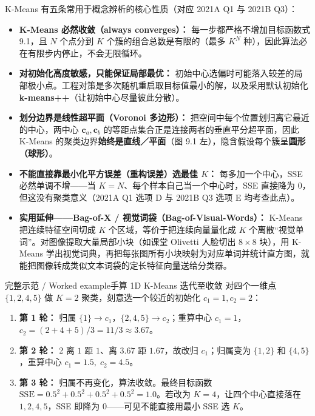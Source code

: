 K-Means 有五条常用于概念辨析的核心性质（对应 2021A Q1 与 2021B Q3）：
\begin{itemize}
\item \textbf{K-Means 必然收敛（always converges）：} 每一步都严格不增加目标函数式 9.1，且 $N$ 个点分到 $K$ 个簇的组合总数是有限的（最多 $K^N$ 种），因此算法必在有限步内停止，不会无限循环。
\item \textbf{对初始化高度敏感，只能保证局部最优：} 初始中心选偏时可能落入较差的局部极小点。工程对策是多次随机重启取目标值最小的解，以及采用默认初始化 \textbf{k-means++}（让初始中心尽量彼此分散）。
\item \textbf{划分边界是线性超平面（Voronoi 多边形）：} 把空间中每个位置划归离它最近的中心，两中心 $\mathbf{c}_a, \mathbf{c}_b$ 的等距点集合正是连接两者的垂直平分超平面，因此 K-Means 的聚类边界\textbf{始终是直线／平面}（图 9.1 左），隐含假设每个簇呈\textbf{圆形（球形）}。
\item \textbf{不能直接靠最小化平方误差（重构误差）选最佳 $K$：} 每多加一个中心，SSE 必然单调不增——当 $K=N$、每个样本自己当一个中心时，SSE 直接降为 0，但这没有聚类意义（2021A Q1 选项 D 与 2021B Q3 选项 E 均考查此点）。
\item \textbf{实用延伸——Bag-of-X / 视觉词袋（Bag-of-Visual-Words）：} K-Means 把连续特征空间切成 $K$ 个区域，等价于把连续向量量化成 $K$ 个离散“视觉单词”。对图像提取大量局部小块（如课堂 Olivetti 人脸切出 $8\times 8$ 块），用 K-Means 学出视觉词典，再把每张图所有小块映射为对应单词并统计直方图，就能把图像转成类似文本词袋的定长特征向量送给分类器。
\end{itemize}

\begin{StudyBlock}{完整示范 / Worked example}{手算 1D K-Means 迭代至收敛}
对四个一维点 $\{1, 2, 4, 5\}$ 做 $K=2$ 聚类，刻意选一个较近的初始化 $c_1=1, c_2=2$：
\begin{enumerate}
\item \textbf{第 1 轮：} 归属 $\{1\}\to c_1$，$\{2,4,5\}\to c_2$；重算中心 $c_1=1$，$c_2=(2+4+5)/3 = 11/3 \approx 3.67$。
\item \textbf{第 2 轮：} 2 离 $1$ 距 $1$、离 $3.67$ 距 $1.67$，故改归 $c_1$；归属变为 $\{1,2\}$ 和 $\{4,5\}$，重算中心 $c_1=1.5,\; c_2=4.5$。
\item \textbf{第 3 轮：} 归属不再变化，算法收敛。最终目标函数 $\mathrm{SSE} = 0.5^2+0.5^2+0.5^2+0.5^2 = 1.0$。若改为 $K=4$，让四个中心直接落在 $1,2,4,5$，SSE 即降为 $0$——可见不能直接用最小 SSE 选 $K$。
\end{enumerate}
\end{StudyBlock}


